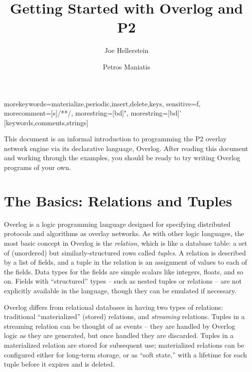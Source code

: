 \documentclass{article}
\title{Getting Started with Overlog and P2}
\author{Joe Hellerstein \and Petros Maniatis}
\begin{document}
\date{}
\maketitle

%
  {morekeywords={materialize,periodic,insert,delete,keys},%
   sensitive=f,%
   morecomment=[s]{/*}{*/},%
   morestring=[bd]",%
   morestring=[bd]'%
  }[keywords,comments,strings]%


	
This document is an informal introduction to programming the P2
overlay network engine via its declarative language, Overlog.  After
reading this document and working through the examples, you should
be ready to try writing Overlog programs of your own.

\section{The Basics: Relations and Tuples}
Overlog is a logic programming language designed for specifying
distributed protocols and algorithms as overlay networks.  As with
other logic languages, the most basic concept in Overlog is the {\em
  relation}, which is like a database table: a set of
(unordered) but similarly-structured rows called {\em tuples}.  A
relation is described by a list of fields, and a tuple in the
relation is an assignment of values to each of the fields.  Data types
for the fields are simple scalars like integers, floats, and so
on. Fields with ``structured'' types -- such as
nested tuples or relations -- are not explicitly available in the
language, though they can be emulated if necessary.

Overlog differs from relational databases in having two types of
relations: traditional ``materialized'' (stored) relations, and
{\em streaming} relations.  Tuples in a streaming relation can be thought of
as events -- they are handled by Overlog logic as they are generated,
but once handled they are discarded.  Tuples in a materialized
relation are stored for subsequent use; materialized relations can be
configured either for long-term storage, or as ``soft state,'' with a
lifetime for each tuple before it expires and is deleted.
\end{document}
